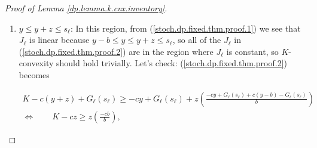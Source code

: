 \begin{proof}[Proof of Lemma \ref{dp.lemma.k.cvx.inventory}]
\begin{enumerate}
so proving (\ref{stoch.dp.fixed.thm.proof.3}) is equivalent to proving \(K\)-convexity. We will look at two sub-cases:

\begin{itemize}

\item \textbf{Sub-case 1:} \(G_\ell(y) \geq G_\ell(s_\ell) \). By \(K\)-convexity of \(G_\ell\), using (\ref{stoch.dp.k.cvx.2}), 

%

\[
K +  G_\ell(y+z) \geq  G_\ell(y)  + z \left(  \frac{G_\ell(y) - G_\ell(s_\ell) }{y - s_\ell} \right) \geq  G_\ell(y)  + z \left(  \frac{G_\ell(y) - G_\ell(s_\ell) }{b} \right)
\]


where the last step follows because \(y - b < s_\ell \iff 1/(y - s_\ell) >  1/b\).

\item  \textbf{Sub-case 2:} \(G_\ell(y) < G_\ell(s_\ell)\). Then

\begin{align*}
K + G_\ell(y + z) & \geq K + G_\ell(S_\ell)
\\ & =   G_\ell(s_\ell)
\\ & > G_\ell(y) & \text{(by assumption of sub-case)}
\\ & \geq G_\ell(y) + z \left(\frac{\overbrace{ G_\ell(y) - G_\ell(s_\ell)}^{< 0}}{b} \right),
\end{align*}

verifying (\ref{stoch.dp.fixed.thm.proof.3}) and proving \(K\)-convexity in this case.

\end{itemize}

\item \(y \leq y+z \leq s_\ell\): In this region, from (\ref{stoch.dp.fixed.thm.proof.1}) we see that \(J_\ell\) is linear because \(y - b \leq y \leq y + z \leq s_\ell\), so all of the \(J_\ell\) in (\ref{stoch.dp.fixed.thm.proof.2}) are in the region where \(J_\ell\) is constant, so \(K\)-convexity should hold trivially. Let's check: (\ref{stoch.dp.fixed.thm.proof.2}) becomes

\begin{multline*}
K -c(y+z) + G_\ell(s_\ell) \geq -cy +  G_\ell(s_\ell)+ z \left( \frac{-cy +  G_\ell(s_\ell)  + c(y - b) -  G_\ell(s_\ell)}{b} \right)
\\ \iff \qquad K -cz \geq     z \left( \frac{   -cb }{b} \right),
\end{multline*}


\end{enumerate}
\end{proof}

